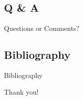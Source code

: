 \documentclass{beamer}
\begin{document}

\subsection{Q \& A}
\begin{frame}
    \begin{center}
        \Huge{Questions or Comments?}
    \end{center}
\end{frame}


\subsection{Bibliography}
\begin{frame}[allowframebreaks]{Bibliography}
    \printbibliography
\end{frame}



\begin{frame}
    \begin{center}
        \Huge{Thank you!}
    \end{center}
\end{frame}
\end{document}

